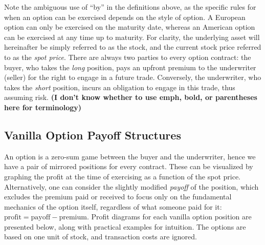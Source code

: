 \documentclass[english,12pt,a4paper,pdftex,sci,utf8]{aaltothesis}
\begin{document}
Note the ambiguous use of ``by'' in the definitions above, as the specific rules for when an option can be exercised depends on the style of option. A European option can only be exercised on the maturity date, whereas an American option can be exercised at any time up to maturity. For clarity, the underlying asset will hereinafter be simply referred to as the stock, and the current stock price referred to as the \emph{spot price}. There are always two parties to every option contract: the buyer, who takes the \emph{long} position, pays an upfront premium to the underwriter (seller) for the right to engage in a future trade. Conversely, the underwriter, who takes the \emph{short} position, incurs an obligation to engage in this trade, thus assuming risk. \textbf{(I don't know whether to use emph, bold, or parentheses here for terminology)}

\subsection{Vanilla Option Payoff Structures}\label{payoffs}

An option is a zero-sum game between the buyer and the underwriter, hence we have a pair of mirrored positions for every contract. These can be visualized by graphing the profit at the time of exercising as a function of the spot price. Alternatively, one can consider the slightly modified \emph{payoff} of the position, which excludes the premium paid or received to focus only on the fundamental mechanics of the option itself, regardless of what someone paid for it: $\text{profit} = \text{payoff} - \text{premium}$. Profit diagrams for each vanilla option position are presented below, along with practical examples for intuition. The options are based on one unit of stock, and transaction costs are ignored.
\end{document}
